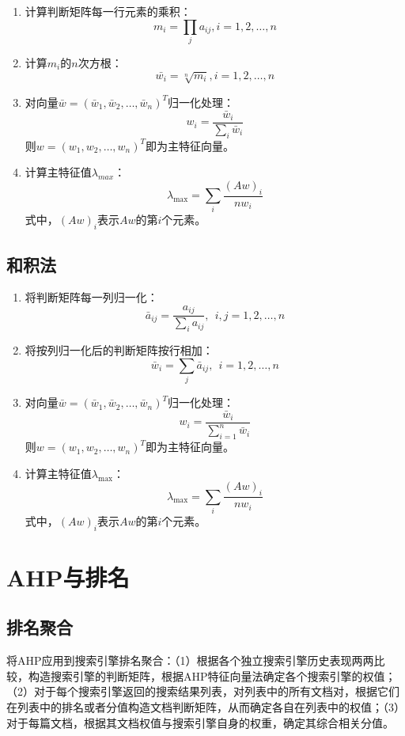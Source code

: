 \begin{enumerate}[（1）]
\item 计算判断矩阵每一行元素的乘积：
\[m_i = \prod_j a_{ij},i=1,2,\ldots,n\]

\item 计算$m_i$的$n$次方根：
\[\bar{w_i} = \sqrt[n]{m_i},i=1,2,\ldots,n\]

\item 对向量$\bar{w} = (\bar{w}_1,\bar{w}_2,\ldots,\bar{w}_n)^T$归一化处理：
\[w_i = \frac{\bar{w}_i}{\sum \limits_i \bar{w}_i}\]
则$w=(w_1,w_2,\ldots,w_n)^T$即为主特征向量。

\item 计算主特征值$\lambda_{max}$：
\[\lambda_{\max} = \sum_i \frac{(Aw)_i}{nw_i}\]
式中，$(Aw)_i$表示$Aw$的第$i$个元素。

\end{enumerate}

\subsection{和积法}
\begin{enumerate}[（1）]
\item 将判断矩阵每一列归一化：
\[\bar{a}_{ij} = \frac{a_{ij}}{\sum \limits_i a_{ij}},~~i,j = 1,2,\ldots,n\]

\item 将按列归一化后的判断矩阵按行相加：
\[\bar{w}_i = \sum_j \bar{a}_{ij},~~i=1,2,\ldots,n\]

\item 对向量$\bar{w} = (\bar{w}_1,\bar{w}_2,\ldots,\bar{w}_n)^T$归一化处理：
\[w_i = \frac{\bar{w}_i}{\sum \limits_{i=1}^n{\bar{w}_i}}\]
则$w=(w_1,w_2,\ldots,w_n)^T$即为主特征向量。

\item 计算主特征值$\lambda_{\max}$：
\[\lambda_{\max} = \sum_i {\frac{(Aw)_i}{nw_i}}\]
式中，$(Aw)_i$表示$Aw$的第$i$个元素。
\end{enumerate}

\section{AHP与排名}
\subsection{排名聚合}
\cite{de2010search}将AHP应用到搜索引擎排名聚合：（1）根据各个独立搜索引擎历史表现两两比较，构造搜索引擎的判断矩阵，根据AHP特征向量法确定各个搜索引擎的权值；（2）对于每个搜索引擎返回的搜索结果列表，对列表中的所有文档对，根据它们在列表中的排名或者分值构造文档判断矩阵，从而确定各自在列表中的权值；（3）对于每篇文档，根据其文档权值与搜索引擎自身的权重，确定其综合相关分值。

